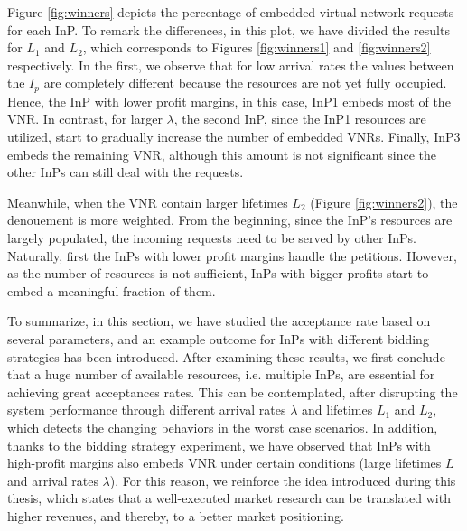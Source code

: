 Figure \ref{fig:winners} depicts the percentage of embedded virtual network requests for each InP. To remark the differences, in this plot, we have divided the results for $L_1$ and $L_2$, which corresponds to Figures \ref{fig:winners1} and \ref{fig:winners2} respectively. In the first, we observe that for low arrival rates the values between the $I_p$ are completely different because the resources are not yet fully occupied. Hence, the InP with lower profit margins, in this case, InP1 embeds most of the VNR. In contrast, for larger $\lambda$, the second InP, since the InP1 resources are utilized, start to gradually increase the number of embedded VNRs. Finally, InP3 embeds the remaining VNR, although this amount is not significant since the other InPs can still deal with the requests.

Meanwhile, when the VNR contain larger lifetimes $L_2$ (Figure \ref{fig:winners2}), the denouement is more weighted. From the beginning, since the InP's resources are largely populated, the incoming requests need to be served by other InPs. Naturally, first the InPs with lower profit margins handle the petitions. However, as the number of resources is not sufficient, InPs with bigger profits start to embed a meaningful fraction of them.

To summarize, in this section, we have studied the acceptance rate based on several parameters, and an example outcome for InPs with different bidding strategies has been introduced. After examining these results, we first conclude that a huge number of available resources, i.e. multiple InPs, are essential for achieving great acceptances rates. This can be contemplated, after disrupting the system performance through different arrival rates $\lambda$ and lifetimes $L_1$ and $L_2$, which detects the changing behaviors in the worst case scenarios. In addition, thanks to the bidding strategy experiment, we have observed that InPs with high-profit margins also embeds VNR under certain conditions (large lifetimes $L$ and arrival rates $\lambda$). For this reason, we reinforce the idea introduced during this thesis, which states that a well-executed market research can be translated with higher revenues, and thereby, to a better market positioning.

